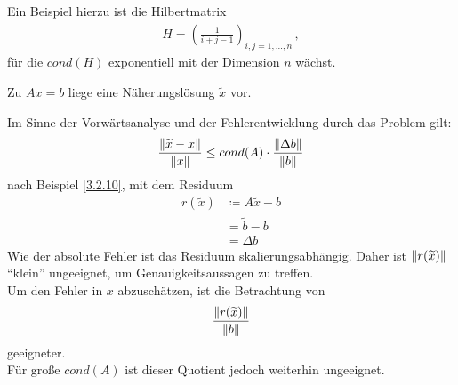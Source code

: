 Ein Beispiel hierzu ist die Hilbertmatrix
\begin{gather*}
  H  =  \left( \frac{1}{i + j -1 } \right)_{i,j= 1,\ldots, n}\, ,
\end{gather*}
für die $cond ( H)$ exponentiell mit der Dimension $n$ wächst.


Zu $Ax=b$ liege eine Näherungslösung $\widetilde{x}$ vor.


Im Sinne der Vorwärtsanalyse und der Fehlerentwicklung durch das Problem gilt:
\begin{gather*}
  \frac{\left\| \widetilde{x}-x \right\|}{\left\| x \right\|} \leq cond(A) \cdot \frac{\left\| \Delta b \right\|}{\left\| b \right\|}
\end{gather*}
nach Beispiel \ref{3.2.10}, 
mit dem Residuum 
\begin{align}
  r(\widetilde{x})  & \coloneqq A\widetilde{x} - b \label{III.4.1} \\ \nonumber 
                    &	= \widetilde{b}-b \\ \nonumber
                    & = \Delta b
\end{align}
Wie der absolute Fehler ist das Residuum skalierungsabhängig.
Daher ist $\left\| r(\widetilde{x}) \right\|$ \enquote{klein} ungeeignet, um
Genauigkeitsaussagen zu treffen. \\
Um den Fehler in $x$ abzuschätzen, ist die Betrachtung von 
\begin{gather}
  \frac{\left\| r(\widetilde{x}) \right\|}{\left\| b \right\|} \label{III.4.2}
\end{gather}
geeigneter. \\
Für große $cond(A)$ ist dieser Quotient jedoch weiterhin ungeeignet.


